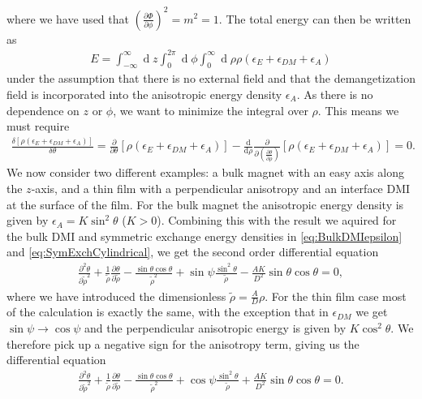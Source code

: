 \documentclass[12pt, a4paper]{article}		%
\renewcommand{\d}[1]{\ensuremath{\operatorname{d}\!{#1}}}
\numberwithin{equation}{section}
\begin{document}
where we have used that $(\frac{\partial\Phi}{\partial\phi})^2=m^2=1$. The total energy can then be written as
\begin{align}
E = \int_{-\infty}^{\infty}\d z \int_0^{2\pi} \d\phi\int_0^{\infty} \d\rho \rho \left(\epsilon_E + \epsilon_{DM} + \epsilon_A\right)
\end{align}
under the assumption that there is no external field and that the demangetization field is incorporated into the anisotropic energy density $\epsilon_A$. As there is no dependence on $z$ or $\phi$, we want to minimize the integral over $\rho$. This means we must require
\begin{align}
\frac{\delta \left[\rho\left(\epsilon_E+\epsilon_{DM}+\epsilon_A\right)\right]}{\delta\theta} = \frac{\partial}{\partial\theta}\left[\rho\left(\epsilon_E+\epsilon_{DM}+\epsilon_A\right)\right] - \frac{\textrm{d}}{\textrm{d}\rho} \frac{\partial}{\partial(\frac{\partial \theta}{\partial\rho})}\left[\rho\left(\epsilon_E+\epsilon_{DM}+\epsilon_A\right)\right] = 0.
\end{align}
We now consider two different examples: a bulk magnet with an easy axis along the $z$-axis, and a thin film with a perpendicular anisotropy and an interface DMI at the surface of the film. For the bulk magnet the anisotropic energy density is given by $\epsilon_A = K\sin^2\theta$ ($K>0$). Combining this with the result we aquired for the bulk DMI and symmetric exchange energy densities in \eqref{eq:BulkDMIepsilon} and \eqref{eq:SymExchCylindrical}, we get the second order differential equation
\begin{align}
\label{eq:ODEthetaBulk}
\frac{\partial^2\theta}{\partial\tilde{\rho}^2} + \frac{1}{\tilde{\rho}}\frac{\partial\theta}{\partial\tilde{\rho}} - \frac{\sin\theta\cos\theta}{\tilde{\rho}^2}+\sin\psi\frac{\sin^2\theta}{\tilde{\rho}}-\frac{AK}{D^2}\sin\theta\cos\theta = 0,
\end{align}
where we have introduced the dimensionless $\tilde{\rho} = \frac{A}{D}\rho$. For the thin film case most of the calculation is exactly the same, with the exception that in $\epsilon_{DM}$ we get $\sin\psi\rightarrow\cos\psi$ and the perpendicular anisotropic energy is given by $K\cos^2\theta$. We therefore pick up a negative sign for the anisotropy term, giving us the differential equation
\begin{align}
\label{eq:ODEthetaFilm}
\frac{\partial^2\theta}{\partial\tilde{\rho}^2} + \frac{1}{\tilde{\rho}}\frac{\partial\theta}{\partial\tilde{\rho}} - \frac{\sin\theta\cos\theta}{\tilde{\rho}^2}+\cos\psi\frac{\sin^2\theta}{\tilde{\rho}}+\frac{AK}{D^2}\sin\theta\cos\theta = 0.
\end{align}
\end{document}
